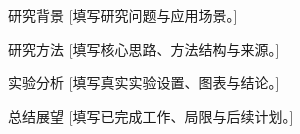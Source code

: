 \documentclass[aspectratio=169,11pt]{beamer}
\begin{document}
\DrawCoverPage
{}
\begin{frame}{研究背景}
  [填写研究问题与应用场景。]
\end{frame}
\begin{frame}{研究方法}
  [填写核心思路、方法结构与来源。]
\end{frame}
\begin{frame}{实验分析}
  [填写真实实验设置、图表与结论。]
\end{frame}
\begin{frame}{总结展望}
  [填写已完成工作、局限与后续计划。]
\end{frame}
\DrawThanksPage
\end{document}
